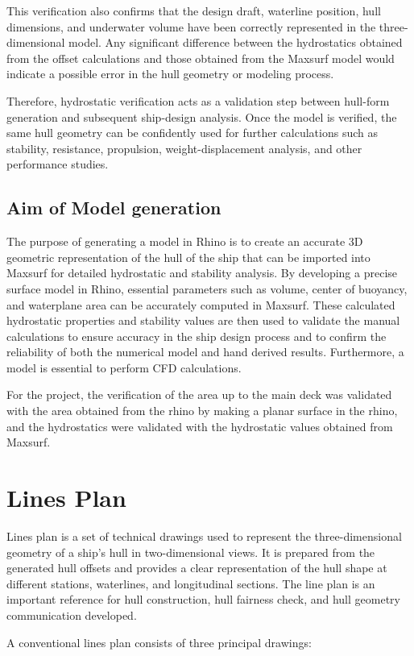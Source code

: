 \documentclass[12pt,a4paper,twoside]{report}
\begin{document}
\vspace{\baselineskip}\par\noindent This verification also confirms that the design draft, waterline position, hull dimensions, and underwater volume have been correctly represented in the three-dimensional model. Any significant difference between the hydrostatics obtained from the offset calculations and those obtained from the Maxsurf model would indicate a possible error in the hull geometry or modeling process.
\vspace{\baselineskip}\par\noindent Therefore, hydrostatic verification acts as a validation step between hull-form generation and subsequent ship-design analysis. Once the model is verified, the same hull geometry can be confidently used for further calculations such as stability, resistance, propulsion, weight-displacement analysis, and other performance studies.

\subsection{Aim of Model generation}
The purpose of generating a model in Rhino is to create an accurate 3D 
geometric representation of the hull of the ship that can be imported into Maxsurf for detailed 
hydrostatic and stability analysis. By developing a precise surface model in Rhino, 
essential parameters such as volume, center of buoyancy, and waterplane area can be 
accurately computed in Maxsurf. These calculated hydrostatic properties and stability 
values are then used to validate the manual calculations to ensure accuracy in the ship design process and to confirm the reliability of both the numerical model and hand
derived results. Furthermore, a model is essential to perform CFD calculations.  
\vspace{\baselineskip}\par\noindent For the project, the verification of the area up to the main deck was validated 
with the area obtained from the rhino by making a planar surface in the rhino, and the hydrostatics 
were validated with the hydrostatic values obtained from Maxsurf.

\section{Lines Plan}
Lines plan is a set of technical drawings used to represent the three-dimensional geometry of a ship's hull in two-dimensional views. It is prepared from the generated hull offsets and provides a clear representation of the hull shape at different stations, waterlines, and longitudinal sections. The line plan is an important reference for hull construction, hull fairness check, and hull geometry communication developed. 
\vspace{\baselineskip}\par\noindent A conventional lines plan consists of three principal drawings:
\end{document}
